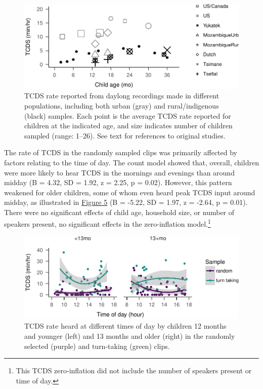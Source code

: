 \documentclass[floatsintext,man]{apa6}
\theoremstyle{definition}
\theoremstyle{definition}
\theoremstyle{definition}
\theoremstyle{remark}
\begin{document}
\begin{figure}
\centering
\includegraphics{Tseltal-CLE_files/figure-latex/fig4-1.pdf}
\caption{\label{fig:fig4}TCDS rate reported from daylong recordings made in
different populations, including both urban (gray) and rural/indigenous
(black) samples. Each point is the average TCDS rate reported for
children at the indicated age, and size indicates number of children
sampled (range: 1--26). See text for references to original studies.}
\end{figure}

The rate of TCDS in the randomly sampled clips was primarily affected by
factors relating to the time of day. The count model showed that,
overall, children were more likely to hear TCDS in the mornings and
evenings than around midday (B = 4.32, SD = 1.92, z = 2.25, p = 0.02).
However, this pattern weakened for older children, some of whom even
heard peak TCDS input around midday, as illustrated in
\protect\hyperlink{fig5}{Figure 5} (B = -5.22, SD = 1.97, z = -2.64, p =
0.01). There were no significant effects of child age, household size,
or number of speakers present, no significant effects in the
zero-inflation model.\footnote{This TCDS zero-inflation did not include
  the number of speakers present or time of day.}

\begin{figure}
\centering
\includegraphics{Tseltal-CLE_files/figure-latex/fig5-1.pdf}
\caption{\label{fig:fig5}TCDS rate heard at different times of day by
children 12 months and younger (left) and 13 months and older (right) in
the randomly selected (purple) and turn-taking (green) clips.}
\end{figure}
\end{document}
